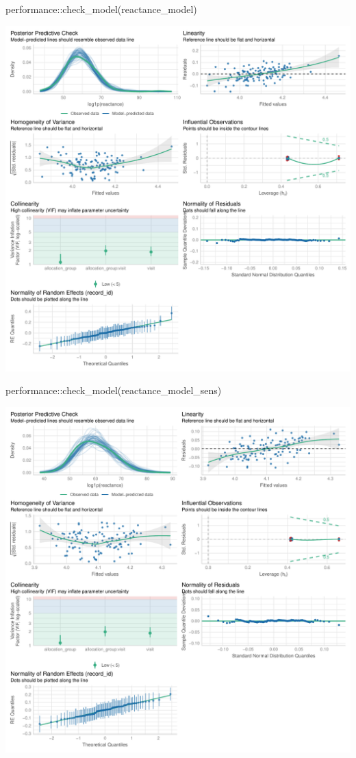 \documentclass[
  letterpaper,
  DIV=11,
  numbers=noendperiod]{scrartcl}
\newenvironment{Shaded}{\begin{snugshade}}{\end{snugshade}}
\newcommand{\FunctionTok}[1]{\textcolor[rgb]{0.28,0.35,0.67}{#1}}
\newcommand{\NormalTok}[1]{\textcolor[rgb]{0.00,0.23,0.31}{#1}}
\newcommand{\SpecialCharTok}[1]{\textcolor[rgb]{0.37,0.37,0.37}{#1}}
\begin{document}
\begin{Shaded}
\begin{Highlighting}[]
\NormalTok{performance}\SpecialCharTok{::}\FunctionTok{check\_model}\NormalTok{(reactance\_model)}
\end{Highlighting}
\end{Shaded}

\includegraphics{Outcomes_V1V2V3_files/figure-pdf/reactance_4-1.pdf}

\begin{Shaded}
\begin{Highlighting}[]
\NormalTok{performance}\SpecialCharTok{::}\FunctionTok{check\_model}\NormalTok{(reactance\_model\_sens)}
\end{Highlighting}
\end{Shaded}

\includegraphics{Outcomes_V1V2V3_files/figure-pdf/reactance_4-2.pdf}
\end{document}
